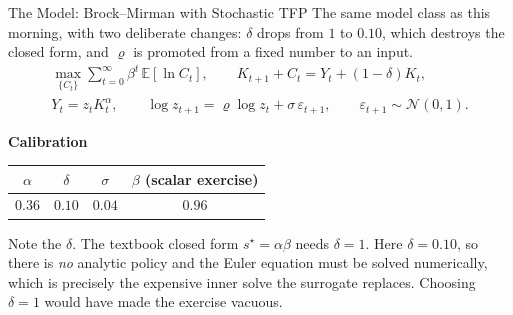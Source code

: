 \documentclass[aspectratio=169,11pt]{beamer}
\newcommand{\emphc}[1]{\textcolor{harvardcrimson}{#1}}
\newcommand{\E}[1]{\mathbb{E}\!\left[#1\right]}
\begin{document}
\begin{frame}{The Model: Brock--Mirman with Stochastic TFP}
\small
The same model class as this morning, with two deliberate changes: $\delta$ drops from $1$ to $0.10$, which destroys the closed form, and $\varrho$ is promoted from a fixed number to an input.
\begin{gather*}
\max_{\{C_t\}} \sum_{t=0}^{\infty} \beta^t\, \E{\ln C_t},
\qquad K_{t+1} + C_t = Y_t + (1-\delta)K_t ,\\[4pt]
Y_t = z_t K_t^{\alpha}, \qquad
\log z_{t+1} = \varrho \log z_t + \sigma\,\varepsilon_{t+1},
\qquad \varepsilon_{t+1} \sim \mathcal{N}(0,1).
\end{gather*}

\vspace{0.15cm}
\textbf{Calibration}
\begin{center}\small
\begin{tabular}{cccc}
\toprule
$\alpha$ & $\delta$ & $\sigma$ & $\beta$ (scalar exercise) \\
\midrule
$0.36$ & $0.10$ & $0.04$ & $0.96$ \\
\bottomrule
\end{tabular}
\end{center}

\vspace{0.1cm}
{\footnotesize \emphc{Note the $\delta$.} The textbook closed form $s^\star = \alpha\beta$ needs $\delta = 1$. Here $\delta = 0.10$, so there is \emph{no} analytic policy and the Euler equation must be solved numerically, which is precisely the expensive inner solve the surrogate replaces. Choosing $\delta=1$ would have made the exercise vacuous.}
\end{frame}
\end{document}
